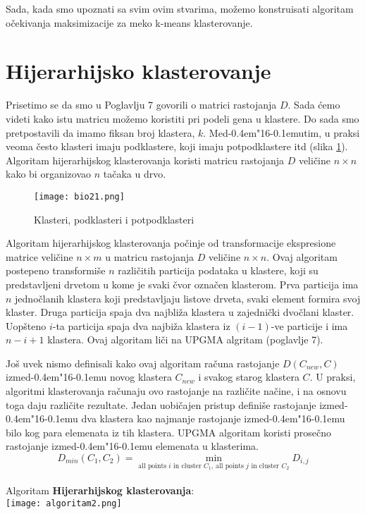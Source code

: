 \documentclass[a4paper]{book}
\def \dj {d\kern-0.4em\char"16\kern-0.1em}
\begin{document}
Sada, kada smo upoznati sa svim ovim stvarima, možemo konstruisati algoritam očekivanja maksimizacije za meko k-means klasterovanje.

\section{Hijerarhijsko klasterovanje}

Prisetimo se da smo u Poglavlju 7 govorili o matrici rastojanja $D$. Sada ćemo videti kako istu matricu možemo koristiti pri podeli gena u klastere. Do sada smo pretpostavili da imamo fiksan broj klastera, $k$. Me\dj utim, u praksi veoma često klasteri imaju podklastere, koji imaju potpodklastere itd (slika \ref{slika 21}). Algoritam hijerarhijskog klasterovanja koristi matricu rastojanja $D$ veličine $n \times n$ kako bi organizovao $n$ tačaka u drvo. 
\begin{figure}
    \centering
    \texttt{[image: bio21.png]}
    \caption{Klasteri, podklasteri i potpodklasteri}
    \label{slika 21}
\end{figure}

Algoritam hijerarhijskog klasterovanja počinje od transformacije ekspresione matrice veličine $n \times m$ u matricu rastojanja $D$ veličine $n \times n$. Ovaj algoritam postepeno transformiše $n$ različitih particija podataka u klastere, koji su predstavljeni drvetom u kome je svaki čvor označen klasterom. Prva particija ima $n$ jednočlanih klastera koji predstavljaju listove drveta, svaki element formira svoj klaster. Druga particija spaja dva najbliža klastera u zajednički dvočlani klaster. Uopšteno $i$-ta particija spaja dva najbiža klastera iz $(i-1)$-ve particije i ima $n-i+1$ klastera. Ovaj algoritam liči na UPGMA algritam (poglavlje 7).

Još uvek nismo definisali kako ovaj algoritam računa rastojanje $D(C_{new}, C)$ izme\dj u novog klastera $C_{new}$ i svakog starog klastera $C$. U praksi, algoritmi klasterovanja računaju ovo rastojanje na različite načine, i na osnovu toga daju različite rezultate. Jedan uobičajen pristup definiše rastojanje izme\dj u dva klastera kao najmanje rastojanje izme\dj u bilo kog para elemenata iz tih klastera. UPGMA algoritam koristi prosečno rastojanje izme\dj u elemenata u klasterima.
$$
D_{min}(C_1, C_2) = \min_{\text{all points } i \text{ in cluster }C_1\text{, all points } j \text{ in cluster }C_2}D_{i,j} 
$$
\\
Algoritam \textbf{Hijerarhijskog klasterovanja}:
\\
\texttt{[image: algoritam2.png]}
\\
\end{document}
